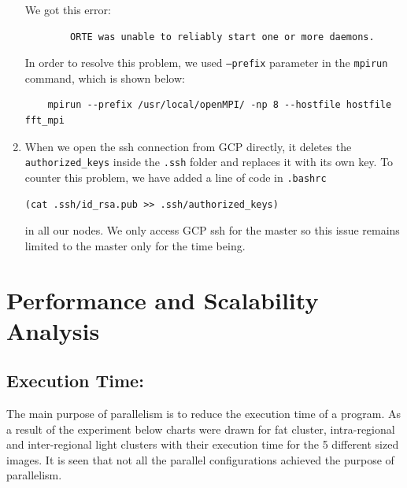 \documentclass{article}
\begin{document}
\begin{enumerate}
    We got this error:
    \begin{verbatim}
        ORTE was unable to reliably start one or more daemons.
    \end{verbatim}
    In order to resolve this problem, we used \texttt{--prefix} parameter in the \texttt{mpirun} command, which is shown below:
    \begin{verbatim}
    mpirun --prefix /usr/local/openMPI/ -np 8 --hostfile hostfile fft_mpi
    \end{verbatim}
    \item When we open the ssh connection from GCP directly, it deletes the \texttt{authorized\_keys} inside the \texttt{.ssh} folder and replaces it with its own key. To counter this problem, we have added a line of code in \texttt{.bashrc}

\begin{verbatim}
(cat .ssh/id_rsa.pub >> .ssh/authorized_keys)
\end{verbatim}

in all our nodes. We only access GCP ssh for the master so this issue remains limited to the master only for the time being.

\end{enumerate}
\newpage
\section{Performance and Scalability Analysis}

\subsection{Execution Time:} The main purpose of parallelism is to reduce the execution time of a program. As a result of the experiment below charts were drawn for fat cluster, intra-regional  and inter-regional light clusters with their execution time for the 5 different sized images. It is seen that not all the parallel configurations achieved the purpose of parallelism. 
\end{document}
